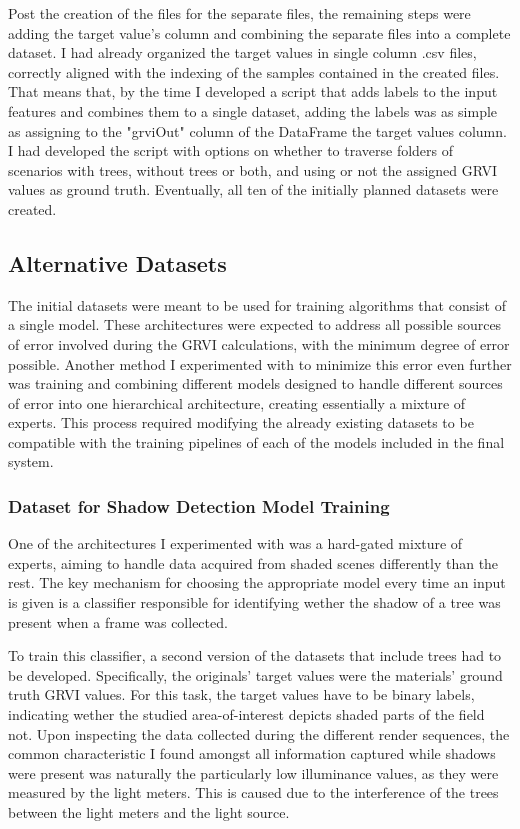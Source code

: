 Post the creation of the files for the separate files, the remaining steps were adding the target value's column and combining the separate files into a complete dataset. I had already organized the target values in single column .csv files, correctly aligned with the indexing of the samples contained in the created files. That means that, by the time I developed a script that adds labels to the input features and combines them to a single dataset, adding the labels was as simple as assigning to the "grviOut" column of the DataFrame the target values column. I had developed the script with options on whether to traverse folders of scenarios with trees, without trees or both, and using or not the assigned GRVI values as ground truth. Eventually, all ten of the initially planned datasets were created.

\subsection{Alternative Datasets}

The initial datasets were meant to be used for training algorithms that consist of a single model. These architectures were expected to address all possible sources of error involved during the GRVI calculations, with the minimum degree of error possible. Another method I experimented with to minimize this error even further was training and combining different models designed to handle different sources of error into one hierarchical architecture, creating essentially a mixture of experts. This process required modifying the already existing datasets to be compatible with the training pipelines of each of the models included in the final system.

\subsubsection{Dataset for Shadow Detection Model Training}

One of the architectures I experimented with was a hard-gated mixture of experts, aiming to handle data acquired from shaded scenes differently than the rest. The key mechanism for choosing the appropriate model every time an input is given is a classifier responsible for identifying wether the shadow of a tree was present when a frame was collected. 

To train this classifier, a second version of the datasets that include trees had to be developed. Specifically, the originals' target values were the materials' ground truth GRVI values. For this task, the target values have to be binary labels, indicating wether the studied area-of-interest depicts shaded parts of the field not. Upon inspecting the data collected during the different render sequences, the common characteristic I found amongst all information captured while shadows were present was naturally the particularly low illuminance values, as they were measured by the light meters. This is caused due to the interference of the trees between the light meters and the light source.

